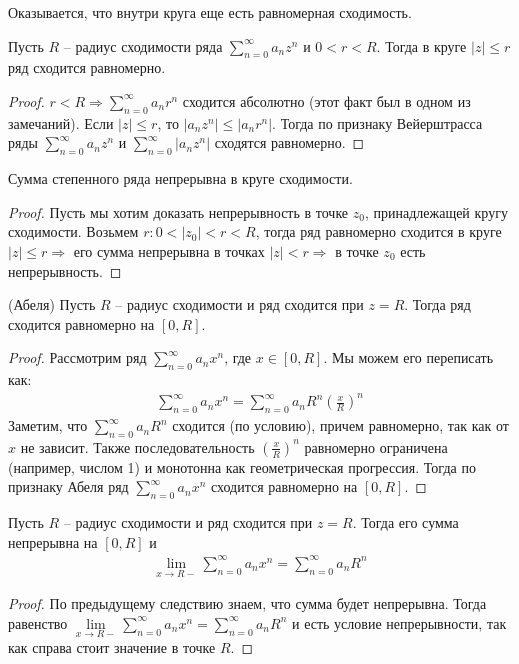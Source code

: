 \vspace*{10mm}
Оказывается, что внутри круга еще есть равномерная сходимость.

\begin{theorem}
    Пусть $R$ -- радиус сходимости ряда $\sum\limits_{n=0}^\infty a_nz^n$ и $0 < r < R$. 
    Тогда в круге $|z| \leqslant r$ ряд сходится равномерно.
\end{theorem}
\begin{proof}
    $r < R \Rightarrow \sum\limits_{n=0}^\infty a_nr^n$ сходится абсолютно (этот факт был в одном из замечаний).
    Если $|z| \leqslant r$, то $|a_nz^n| \leqslant |a_nr^n|$. 
    Тогда по признаку Вейерштрасса ряды $\sum\limits_{n=0}^\infty a_nz^n$ и $\sum\limits_{n=0}^\infty |a_nz^n|$ сходятся равномерно.
\end{proof}
\begin{follow}
    Сумма степенного ряда непрерывна в круге сходимости.
\end{follow}
\begin{proof}
    Пусть мы хотим доказать непрерывность в точке $z_0$, принадлежащей кругу сходимости.
    Возьмем $r: 0 < |z_0| < r < R$, тогда ряд равномерно сходится в круге $|z| \leqslant r \Rightarrow$ его сумма непрерывна в точках $|z| < r \Rightarrow$ в точке $z_0$ есть непрерывность.
\end{proof}

\begin{theorem} (Абеля) \;
    Пусть $R$ -- радиус сходимости и ряд сходится при $z = R$. 
    Тогда ряд сходится равномерно на $[0, R]$.
\end{theorem}
\begin{proof}
    Рассмотрим ряд $\sum\limits_{n = 0}^\infty a_n x^n$, где $x \in [0, R]$.
    Мы можем его переписать как:
    \begin{gather*}
        \sum\limits_{n = 0}^\infty a_n x^n = \sum\limits_{n = 0}^\infty a_n R^n (\frac{x}{R})^n
    \end{gather*}
    Заметим, что $\sum\limits_{n = 0}^\infty a_n R^n$ сходится (по условию), причем равномерно, так как от $x$ не зависит. 
    Также последовательность $(\frac{x}{R})^n$ равномерно ограничена (например, числом 1) и монотонна как геометрическая прогрессия. 
    Тогда по признаку Абеля ряд $\sum\limits_{n = 0}^\infty a_n x^n$ сходится равномерно на $[0, R]$.
\end{proof}

\begin{follow}
    Пусть $R$ -- радиус сходимости и ряд сходится при $z = R$. 
    Тогда его сумма непрерывна на $[0, R]$ и 
    \begin{gather*}
        \lim\limits_{x \to R-} \sum\limits_{n=0}^\infty a_nx^n = \sum\limits_{n=0}^\infty a_nR^n
    \end{gather*}
\end{follow}
\begin{proof}
    По предыдущему следствию знаем, что сумма будет непрерывна. 
    Тогда равенство $\lim\limits_{x \to R-} \sum\limits_{n=0}^\infty a_nx^n = \sum\limits_{n=0}^\infty a_nR^n$ и есть условие непрерывности, так как справа стоит значение в точке $R$.
\end{proof}

